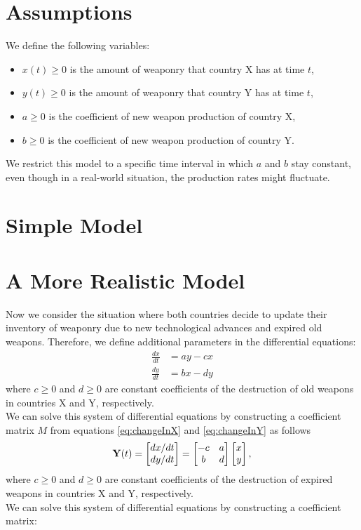 \section{Assumptions}
We define the following variables:
\begin{itemize}
\item $x(t) \ge 0$ is the amount of weaponry that country X has at time $t$,
\item $y(t) \ge 0$ is the amount of weaponry that country Y has at time $t$,
\item $a \ge 0$ is the coefficient of new weapon production of country X,
\item $b \ge 0$ is the coefficient of new weapon production of country Y.
\end{itemize}
We restrict this model to a specific time interval in which $a$ and $b$ stay constant, even though in a real-world situation, the production rates might fluctuate.

\section{Simple Model}		

\section{A More Realistic Model}
Now we consider the situation where both countries decide to update their inventory of weaponry due to new technological advances and expired old weapons. 
Therefore, we define additional parameters in the differential equations:
\begin{align}
\frac{dx}{dt} & = ay - cx \label{eq:changeInX} \\
\frac{dy}{dt} & = bx - dy \label{eq:changeInY}
\end{align}	
where $c \ge 0$ and $d \ge 0$ are constant coefficients of the destruction of old weapons in countries X and Y, respectively. \\
We can solve this system of differential equations by constructing a coefficient matrix $M$ from equations \eqref{eq:changeInX} and \eqref{eq:changeInY} as follows
\[
\bold{Y}(t) = 
 \begin{bmatrix}
	dx/dt \\ dy/dt
 \end{bmatrix}
= \begin{bmatrix}
    -c & a\\ 
    b & d
  \end{bmatrix}
  \begin{bmatrix}
    x \\ y
  \end{bmatrix},
  \]
where $c \ge 0$ and $d \ge 0$ are constant coefficients of the destruction of expired weapons in countries X and Y, respectively. \\
We can solve this system of differential equations by constructing a coefficient matrix:

